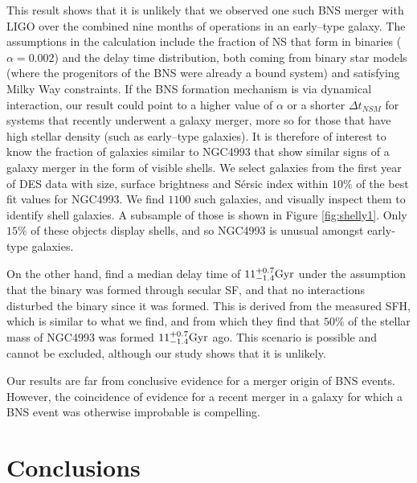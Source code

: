This result shows that it is unlikely that we observed one such BNS merger with LIGO over the combined nine months of operations in an early--type galaxy. The assumptions in the calculation include the fraction of NS that form in binaries ($\alpha=0.002$) and the delay time distribution, both coming from binary star models (where the progenitors of the BNS were already a bound system) and satisfying Milky Way constraints. If the BNS formation mechanism is via dynamical interaction, our result could point to a higher value of $\alpha$ or a shorter $\Delta t_{NSM}$ for systems that recently underwent a galaxy merger, more so for those that have high stellar density (such as early--type galaxies). It is therefore of interest to know the fraction of galaxies similar to NGC4993 that show similar signs of a galaxy merger in the form of visible shells. We select galaxies from the first year of DES data with size, surface brightness and S\'ersic index within $10\%$ of the best fit values for NGC4993. We find $1100$ such galaxies, and visually inspect them to identify shell galaxies. A subsample of those is shown in Figure \ref{fig:shelly1}. Only $15\%$ of these objects display shells, and so NGC4993 is unusual amongst early-type galaxies.

On the other hand, \citet{blanchard} find a median delay time of $11^{+0.7}_{-1.4} {\rm Gyr}$ under the assumption that the binary was formed through secular SF, and that no interactions disturbed the binary since it was formed. This is derived from the measured SFH, which is similar to what we find, and from which they find that $50\%$ of the stellar mass of NGC4993 was formed $11^{+0.7}_{-1.4} {\rm Gyr}$ ago. This scenario is possible and cannot be excluded, although our study shows that it is unlikely.

Our results are far from conclusive evidence for a merger origin of BNS events. However, the coincidence of evidence for a recent merger in a galaxy for which a BNS event was otherwise improbable is compelling.

\section{Conclusions}

